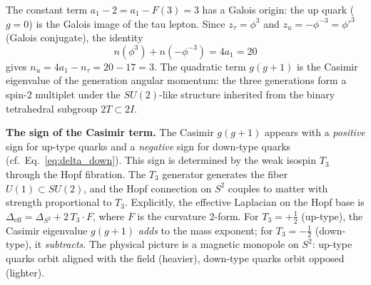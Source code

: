 \documentclass[12pt,a4paper]{article}
\theoremstyle{definition}
\begin{document}
The constant term $a_1 - 2 = a_1 - F(3) = 3$ has a Galois origin: the up quark ($g = 0$) is the Galois image of the tau lepton. Since $z_\tau = \phi^3$ and $z_u = -\phi^{-3} = \phi'^3$ (Galois conjugate), the identity
\begin{equation}
n(\phi^3) + n(-\phi^{-3}) = 4a_1 = 20
\end{equation}
gives $n_u = 4a_1 - n_\tau = 20 - 17 = 3$. The quadratic term $g(g+1)$ is the Casimir eigenvalue of the generation angular momentum: the three generations form a spin-2 multiplet under the $SU(2)$-like structure inherited from the binary tetrahedral subgroup $2T \subset 2I$.

\textbf{The sign of the Casimir term.} The Casimir $g(g+1)$ appears with a \emph{positive} sign for up-type quarks and a \emph{negative} sign for down-type quarks (cf.\ Eq.~\eqref{eq:delta_down}). This sign is determined by the weak isospin $T_3$ through the Hopf fibration. The $T_3$ generator generates the fiber $U(1) \subset SU(2)$, and the Hopf connection on $S^2$ couples to matter with strength proportional to $T_3$. Explicitly, the effective Laplacian on the Hopf base is $\Delta_{\text{eff}} = \Delta_{S^2} + 2\,T_3 \cdot F$, where $F$ is the curvature 2-form. For $T_3 = +\tfrac{1}{2}$ (up-type), the Casimir eigenvalue $g(g+1)$ \emph{adds} to the mass exponent; for $T_3 = -\tfrac{1}{2}$ (down-type), it \emph{subtracts}. The physical picture is a magnetic monopole on $S^2$: up-type quarks orbit aligned with the field (heavier), down-type quarks orbit opposed (lighter).
\end{document}

